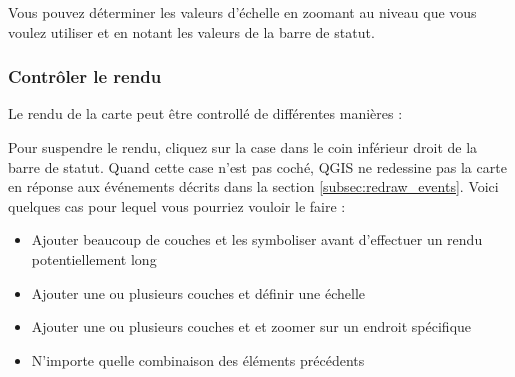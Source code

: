 Vous pouvez d\'eterminer les valeurs d'\'echelle en zoomant au niveau que vous voulez utiliser et en notant les valeurs de la barre de statut.

\subsubsection{Contr\^oler le rendu}\label{label_controlmap}

Le rendu de la carte peut \^etre controll\'e de diff\'erentes mani\`eres :

%
%
%

\label{label_suspendrender}

Pour suspendre le rendu, cliquez sur la case dans le coin inf\'erieur droit de la barre de statut. Quand cette case n'est pas coch\'e, QGIS ne redessine pas la carte en r\'eponse aux \'ev\'enements d\'ecrits dans la section \ref{subsec:redraw_events}. Voici quelques cas pour lequel vous pourriez vouloir le faire :

\begin{itemize}
\item Ajouter beaucoup de couches et les symboliser avant d'effectuer un rendu potentiellement long
\item Ajouter une ou plusieurs couches et d\'efinir une \'echelle
\item Ajouter une ou plusieurs couches et et zoomer sur un endroit sp\'ecifique
\item N'importe quelle combinaison des \'el\'ements pr\'ec\'edents
\end{itemize}

